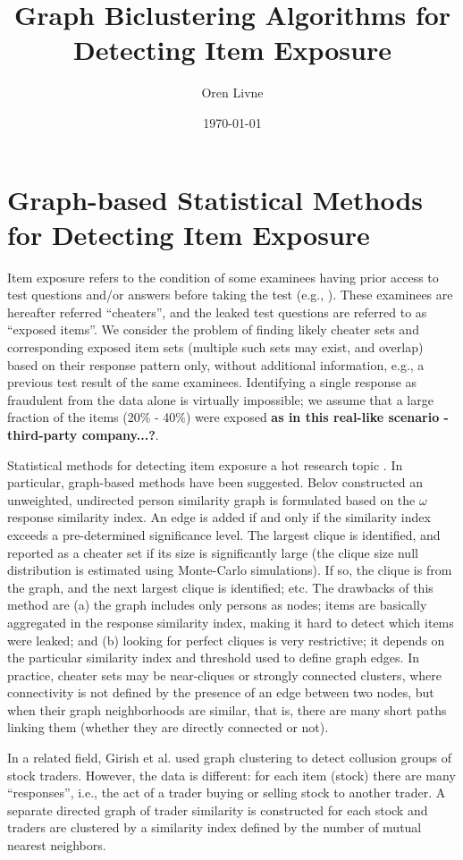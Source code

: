 \documentclass{article}
\title{Graph Biclustering Algorithms for Detecting Item Exposure}
\author[1]{Oren Livne}
\affil[1]{Educational Testing Service, 660 Rosedale Road, Attn: MS-12, T-197, Princeton, NJ 08540. Email: olivne@ets.org}
\date{\today}
\begin{document}
\maketitle

\section{Graph-based Statistical Methods for Detecting Item Exposure}
Item exposure refers to the condition of some examinees having prior access to test questions and/or answers before taking the test (e.g., \cite{Eckerly}). These examinees are hereafter referred ``cheaters'', and the leaked test questions are referred to as ``exposed items''. We consider the problem of finding likely cheater sets and corresponding exposed item sets (multiple such sets may exist, and overlap) based on their response pattern only, without additional information, e.g., a previous test result of the same examinees. Identifying a single response as fraudulent from the data alone is virtually impossible; we assume that a large fraction of the items (20\% - 40\%) were exposed {\bf as in this real-like scenario - third-party company...?}.

Statistical methods for detecting item exposure a hot research topic \cite{test_fraud_book}. In particular, graph-based methods have been suggested. Belov \cite{belov} constructed an unweighted, undirected person similarity graph is formulated based on the $\omega$ response similarity index. An edge is added if and only if the similarity index exceeds a pre-determined significance level. The largest clique is identified, and reported as a cheater set if its size is significantly large (the clique size null distribution is estimated using Monte-Carlo simulations). If so, the clique is from the graph, and the next largest clique is identified; etc. The drawbacks of this method are (a) the graph includes only persons as nodes; items are basically aggregated in the response similarity index, making it hard to detect which items were leaked; and (b) looking for perfect cliques is very restrictive; it depends on the particular similarity index and threshold used to define graph edges. In practice, cheater sets may be near-cliques or strongly connected clusters, where connectivity is not defined by the presence of an edge between two nodes, but when their graph neighborhoods are similar, that is, there are many short paths linking them (whether they are directly connected or not).

In a related field, Girish et al. \cite{collusion_stock_graph_clustering} used graph clustering to detect collusion groups of stock traders. However, the data is different: for each item (stock) there are many ``responses'', i.e., the act of a trader buying or selling stock to another trader. A separate directed graph of trader similarity is constructed for each stock and traders are clustered by a similarity index defined by the number of mutual nearest neighbors.
\end{document}
